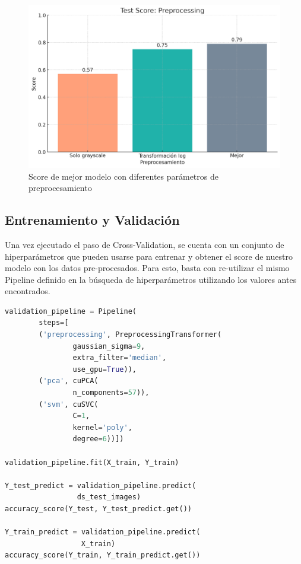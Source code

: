 \documentclass[journal]{IEEEtran}
\begin{document}
\begin{figure}[H]
        \centering
        \includegraphics[width=\linewidth]{figures/preprocessin_gridsearch.png}
        \caption{Score de mejor modelo con diferentes parámetros de preprocesamiento}
        \label{fig:comparativa_preprocesamiento}
\end{figure}

\subsection{Entrenamiento y Validación}
Una vez ejecutado el paso de Cross-Validation, se cuenta con un conjunto de hiperparámetros que pueden usarse para entrenar y obtener el score de nuestro modelo con los datos pre-procesados. Para esto, basta con re-utilizar el mismo Pipeline definido en la búsqueda de hiperparámetros utilizando los valores antes encontrados.

\begin{lstlisting}[language=Python]
validation_pipeline = Pipeline(
        steps=[
        ('preprocessing', PreprocessingTransformer(
                gaussian_sigma=9,
                extra_filter='median',
                use_gpu=True)),
        ('pca', cuPCA(
                n_components=57)),
        ('svm', cuSVC(
                C=1,
                kernel='poly',
                degree=6))])

validation_pipeline.fit(X_train, Y_train)

Y_test_predict = validation_pipeline.predict(
                 ds_test_images)
accuracy_score(Y_test, Y_test_predict.get())

Y_train_predict = validation_pipeline.predict(
                  X_train)
accuracy_score(Y_train, Y_train_predict.get())
\end{lstlisting}
\end{document}

